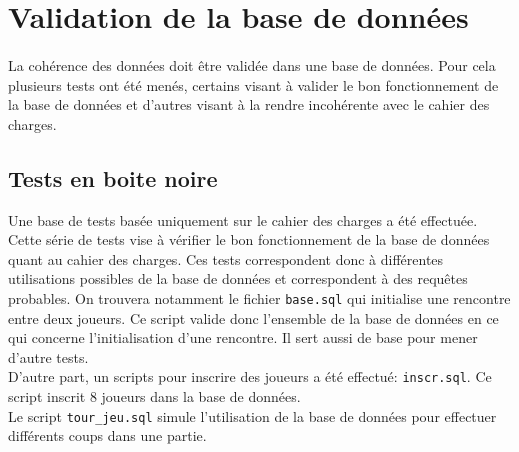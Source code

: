 \documentclass[10pt,a4paper]{report}
\begin{document}
\section{Validation de la base de données}
\paragraph{}
La cohérence des données doit être validée dans une base de données. Pour cela plusieurs tests ont été menés, certains visant à valider le bon
fonctionnement de la base de données et d'autres visant à la rendre incohérente avec le cahier des charges.

\subsection{Tests en boite noire}
Une base de tests basée uniquement sur le cahier des charges a été effectuée. Cette série de tests vise à vérifier le bon fonctionnement de la base de 
données quant au cahier des charges. 
Ces tests correspondent donc à différentes utilisations possibles de la base de données et correspondent à des requêtes probables.
On trouvera notamment le fichier \lstinline!base.sql! qui initialise une rencontre entre deux joueurs. Ce script valide donc l'ensemble de la base de données
en ce qui concerne l'initialisation d'une rencontre. Il sert aussi de base pour mener d'autre tests.\\
D'autre part, un scripts pour inscrire des joueurs a été effectué: \lstinline!inscr.sql!. Ce script inscrit 8 joueurs dans la base de données.\\
Le script \lstinline!tour_jeu.sql! simule l'utilisation de la base de données pour effectuer différents coups dans une partie.
\end{document}
